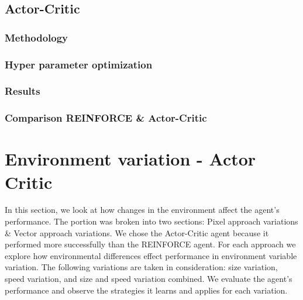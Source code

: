 \documentclass{article}
\begin{document}
\subsection{Actor-Critic}
\label{A-Actor-Critic}


\subsubsection{Methodology}
\label{AC-Method}

\subsubsection{Hyper parameter optimization}
\label{AC-HPO}

\subsubsection{Results}
\label{AC-Results}

\subsubsection{Comparison REINFORCE \& Actor-Critic}
\label{R/AC-Comparison}

\section{Environment variation - Actor Critic}
\label{Environment}
In this section, we look at how changes in the environment affect the agent's performance. 
The portion was broken into two sections: Pixel approach variations \& Vector approach variations.
We chose the Actor-Critic agent because it performed more successfully than the REINFORCE agent.
For each approach we explore how environmental differences effect performance in environment variable variation. 
The following variations are taken in consideration: size variation, speed variation, and size and speed variation combined.
We evaluate the agent's performance and observe the strategies it learns and applies for each variation.
\end{document}
